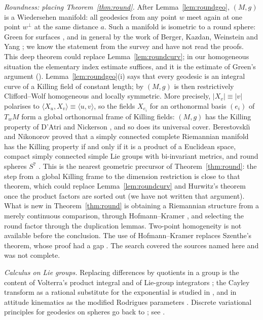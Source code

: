 \documentclass[11pt,reqno]{amsart}
\theoremstyle{definition}
\theoremstyle{remark}
\numberwithin{equation}{section}
\begin{document}
\emph{Roundness: placing Theorem~\ref{thm:round}.}  After Lemma~\ref{lem:roundgeo}, $(M,g)$ is a Wiedersehen manifold: all geodesics from any
point $w$ meet again at one point $w^\perp$ at the same distance $a$.  Such a manifold is isometric to a round sphere: Green for surfaces
\cite{Green63}, and in general by the work of Berger, Kazdan, Weinstein and Yang \cite{Besse78,Weinstein74,Yang80}; we know the statement
from the survey \cite{McKay16} and have not read the proofs.  This deep theorem could replace Lemma~\ref{lem:roundcurv}; in our homogeneous
situation the elementary index estimate suffices, and it is the estimate of Green's argument (\cite[\S13]{McKay16}).  Lemma~\ref{lem:roundgeo}(i)
says that every geodesic is an integral curve of a Killing field of constant length; by \cite[Thms.~7, 10]{BN09} $(M,g)$ is then restrictively
Clifford--Wolf homogeneous and locally symmetric.  More precisely, $\lvert X_v\rvert\equiv\lvert v\rvert$ polarises to $\langle X_u,X_v\rangle\equiv\langle u,v\rangle$,
so the fields $X_{e_i}$ for an orthonormal basis $(e_i)$ of $T_wM$ form a global orthonormal frame of Killing fields: $(M,g)$ has the
Killing property of D'Atri and Nickerson \cite{DN68}, and so does its universal cover.  Berestovski\u{\i} and Nikonorov proved that a
simply connected complete Riemannian manifold has the Killing property if and only if it is a product of a Euclidean space, compact simply
connected simple Lie groups with bi-invariant metrics, and round spheres $S^7$ \cite[Thm.~11]{BN09}.  This is the nearest geometric
precursor of Theorem~\ref{thm:round}: the step from a global Killing frame to the dimension restriction is close to that theorem, which
could replace Lemma~\ref{lem:roundcurv} and Hurwitz's theorem once the product factors are sorted out (we have not written that argument).
What is new in Theorem~\ref{thm:round} is obtaining a Riemannian structure from a merely continuous comparison, through Hofmann--Kramer
\cite{HK15}, and selecting the round factor through the duplication lemmas.  Two-point homogeneity \cite{Wang52,Tits55} is not available before
the conclusion.  The use of Hofmann--Kramer replaces Szenthe's theorem, whose proof had a gap \cite[\S1]{HK15}.  The search covered the
sources named here and was not complete.

\emph{Calculus on Lie groups.}  Replacing differences by quotients in a group is the content of
Volterra's product integral \cite{Volterra,DF,Slavik} and of Lie-group integrators \cite{CG,MK,IMNZ}; the Cayley transform as a
rational substitute for the exponential is studied in \cite{DLP,Iserles01}, and in attitude kinematics as the
modified Rodrigues parameters \cite{Rodrigues,Shuster,SJ}.  Discrete variational principles for geodesics on
spheres go back to \cite{Veselov88,MV}; see \cite{MW}.
\end{document}
